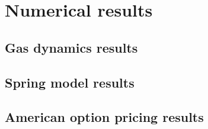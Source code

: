\section{Numerical results}


\subsection{Gas dynamics results}


\subsection{Spring model results}


\subsection{American option pricing results}
